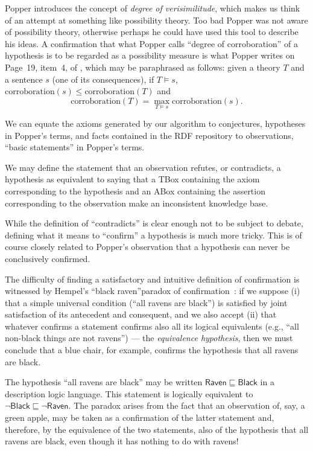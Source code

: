 \documentclass[a4paper]{article}
\newcounter{ex}
\begin{document}
Popper introduces the concept of \emph{degree of verisimilitude}, which makes us think
of an attempt at something like possibility theory.
Too bad Popper was not aware of possibility theory, otherwise perhaps he could have used
this tool to describe his ideas.
A confirmation that what Popper calls ``degree of corroboration'' of a hypothesis
is to be regarded as a possibility measure is what Popper writes on Page~19,
item~4, of \cite{Popper1972}, which may be paraphrased as follows:
given a theory $T$ and a sentence $s$ (one of its consequences),
if $T \models s$, $\mathrm{corroboration}(s) \leq \mathrm{corroboration}(T)$
and
\[
  \mathrm{corroboration}(T) = \max_{T \models s} \mathrm{corroboration}(s).
\]

We can equate the axioms generated by our algorithm to conjectures, hypotheses
in Popper's terms, and facts contained in the RDF repository to observations,
``basic statements'' in Popper's terms.

We may define the statement that an observation refutes, or contradicts, a hypothesis
as equivalent to saying that a TBox containing the axiom corresponding to the hypothesis
and an ABox containing the assertion corresponding to the observation make an
inconsistent knowledge base.

While the definition of ``contradicts'' is clear enough not to be subject to debate,
defining what it means to ``confirm'' a hypothesis is much more tricky. This is
of course closely related to Popper's observation that a hypothesis can never be
conclusively confirmed.

The difficulty of finding a satisfactory and intuitive definition of confirmation
is witnessed by Hempel's ``black raven''paradox of confirmation~\cite{Hempel1945}:
if we suppose (i) that a simple universal condition (``all ravens are black'')
is satisfied by joint satisfaction of its antecedent and consequent, and we
also accept (ii) that whatever confirms a statement confirms also all its logical
equivalents (e.g., ``all non-black things are not ravens'') --- the \emph{equivalence hypothesis},
then we must conclude that a blue chair, for example, confirms the hypothesis
that all ravens are black.

The hypothesis ``all ravens are black'' may be
written $\mathsf{Raven} \sqsubseteq \mathsf{Black}$ in a description logic language.
This statement is logically equivalent to $\neg\mathsf{Black} \sqsubseteq \neg\mathsf{Raven}$.
The paradox arises from the fact that an observation of, say, a green apple,
may be taken as a confirmation of the latter statement and, therefore, by the
equivalence of the two statements, also of the hypothesis that all ravens are black,
even though it has nothing to do with ravens!
\end{document}
